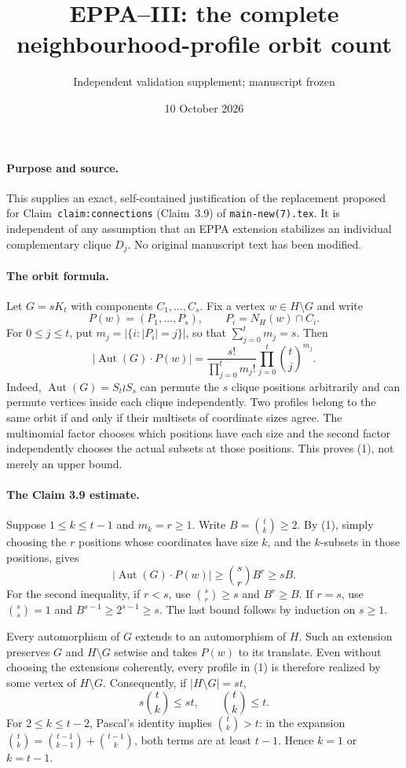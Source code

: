 \documentclass[11pt,a4paper]{article}
\title{EPPA--III: the complete neighbourhood-profile orbit count}
\author{Independent validation supplement; manuscript frozen}
\date{10 October 2026}
\begin{document}
\maketitle

\paragraph{Purpose and source.}
This supplies an exact, self-contained justification of
the replacement proposed for Claim~\texttt{claim:connections}
(Claim~3.9) of \texttt{main-new(7).tex}.
It is independent of any assumption that an EPPA extension
stabilizes an individual complementary clique \(D_j\).
No original manuscript text has been modified.

\paragraph{The orbit formula.}
Let \(G=sK_t\) with components \(C_1,\dots,C_s\).
Fix a vertex \(w\in H\setminus G\) and write
\[
  P(w)=(P_1,\ldots,P_s),\qquad
  P_i=N_H(w)\cap C_i.
\]
For \(0\le j\le t\), put
\(m_j=|\{i:|P_i|=j\}|\), so that
\(\sum_{j=0}^t m_j=s\).
Then
\[
 \boxed{
 \bigl|\operatorname{Aut}(G)\cdot P(w)\bigr|
 =\frac{s!}{\prod_{j=0}^t m_j!}
     \prod_{j=0}^t\binom tj^{m_j}.}
 \tag{1}
\]
Indeed, \(\operatorname{Aut}(G)=S_t\wr S_s\) can
permute the \(s\) clique positions arbitrarily
and can permute vertices inside each clique
independently. Two profiles belong to the
same orbit if and only if their multisets
of coordinate sizes agree. The multinomial
factor chooses which positions have each size
and the second factor independently chooses
the actual subsets at those positions.
This proves (1), not merely an upper bound.

\paragraph{The Claim 3.9 estimate.}
Suppose \(1\le k\le t-1\) and \(m_k=r\ge1\).
Write \(B=\binom tk\ge2\).
By (1), simply choosing the \(r\) positions
whose coordinates have size \(k\), and the
\(k\)-subsets in those positions, gives
\[
 |\operatorname{Aut}(G)\cdot P(w)|
 \ge\binom sr B^r
 \ge sB.
 \tag{2}
\]
For the second inequality, if \(r<s\), use
\(\binom sr\ge s\) and \(B^r\ge B\).
If \(r=s\), use
\(\binom ss=1\) and \(B^{s-1}\ge 2^{s-1}\ge s\).
The last bound follows by induction on \(s\ge1\).

Every automorphism of \(G\) extends to an
automorphism of \(H\). Such an extension
preserves \(G\) and \(H\setminus G\) setwise
and takes \(P(w)\) to its translate.
Even without choosing the extensions coherently,
every profile in (1) is therefore realized
by some vertex of \(H\setminus G\). Consequently,
if \(|H\setminus G|=st\),
\[
          s\binom tk\le st,\qquad
          \binom tk\le t.
\]
For \(2\le k\le t-2\), Pascal's identity
implies \(\binom tk>t\): in the expansion
\(\binom tk=\binom{t-1}{k-1}+
\binom{t-1}{k}\), both terms are at least
\(t-1\). Hence \(k=1\) or \(k=t-1\).
\end{document}
